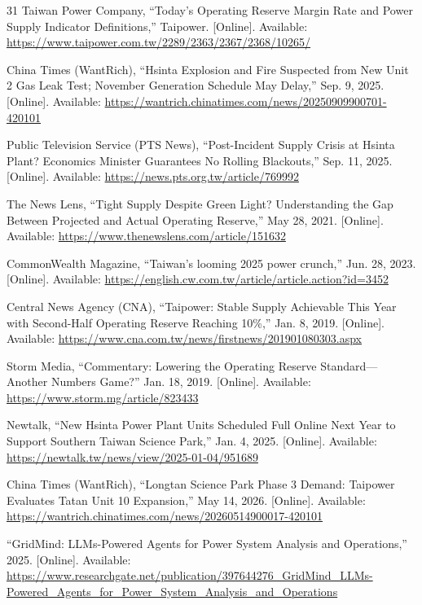 \documentclass[conference]{IEEEtran}
\begin{document}
\begin{thebibliography}{31}
Taiwan Power Company, ``Today's Operating Reserve Margin Rate and Power Supply Indicator Definitions,'' Taipower. [Online]. Available: \url{https://www.taipower.com.tw/2289/2363/2367/2368/10265/}

China Times (WantRich), ``Hsinta Explosion and Fire Suspected from New Unit 2 Gas Leak Test; November Generation Schedule May Delay,'' Sep. 9, 2025. [Online]. Available: \url{https://wantrich.chinatimes.com/news/20250909900701-420101}

Public Television Service (PTS News), ``Post-Incident Supply Crisis at Hsinta Plant? Economics Minister Guarantees No Rolling Blackouts,'' Sep. 11, 2025. [Online]. Available: \url{https://news.pts.org.tw/article/769992}

The News Lens, ``Tight Supply Despite Green Light? Understanding the Gap Between Projected and Actual Operating Reserve,'' May 28, 2021. [Online]. Available: \url{https://www.thenewslens.com/article/151632}

CommonWealth Magazine, ``Taiwan's looming 2025 power crunch,'' Jun. 28, 2023. [Online]. Available: \url{https://english.cw.com.tw/article/article.action?id=3452}

Central News Agency (CNA), ``Taipower: Stable Supply Achievable This Year with Second-Half Operating Reserve Reaching 10\%,'' Jan. 8, 2019. [Online]. Available: \url{https://www.cna.com.tw/news/firstnews/201901080303.aspx}

Storm Media, ``Commentary: Lowering the Operating Reserve Standard---Another Numbers Game?'' Jan. 18, 2019. [Online]. Available: \url{https://www.storm.mg/article/823433}

Newtalk, ``New Hsinta Power Plant Units Scheduled Full Online Next Year to Support Southern Taiwan Science Park,'' Jan. 4, 2025. [Online]. Available: \url{https://newtalk.tw/news/view/2025-01-04/951689}

China Times (WantRich), ``Longtan Science Park Phase 3 Demand: Taipower Evaluates Tatan Unit 10 Expansion,'' May 14, 2026. [Online]. Available: \url{https://wantrich.chinatimes.com/news/20260514900017-420101}

``GridMind: LLMs-Powered Agents for Power System Analysis and Operations,'' 2025. [Online]. Available: \url{https://www.researchgate.net/publication/397644276_GridMind_LLMs-Powered_Agents_for_Power_System_Analysis_and_Operations}


\end{thebibliography}
\end{document}
